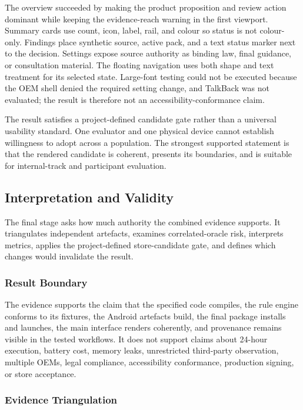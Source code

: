The overview succeeded by making the product proposition and review action dominant while keeping the evidence-reach warning in the first viewport. Summary cards use count, icon, label, rail, and colour so status is not colour-only. Findings place synthetic source, active pack, and a text status marker next to the decision. Settings expose source authority as binding law, final guidance, or consultation material. The floating navigation uses both shape and text treatment for its selected state. Large-font testing could not be executed because the OEM shell denied the required setting change, and TalkBack was not evaluated; the result is therefore not an accessibility-conformance claim.

The result satisfies a project-defined candidate gate rather than a universal usability standard. One evaluator and one physical device cannot establish willingness to adopt across a population. The strongest supported statement is that the rendered candidate is coherent, presents its boundaries, and is suitable for internal-track and participant evaluation.

\subsection{Interpretation and Validity}

The final stage asks how much authority the combined evidence supports. It triangulates independent artefacts, examines correlated-oracle risk, interprets metrics, applies the project-defined store-candidate gate, and defines which changes would invalidate the result.

\subsubsection{Result Boundary}

The evidence supports the claim that the specified code compiles, the rule engine conforms to its fixtures, the Android artefacts build, the final package installs and launches, the main interface renders coherently, and provenance remains visible in the tested workflows. It does not support claims about 24-hour execution, battery cost, memory leaks, unrestricted third-party observation, multiple OEMs, legal compliance, accessibility conformance, production signing, or store acceptance.

\subsubsection{Evidence Triangulation}

